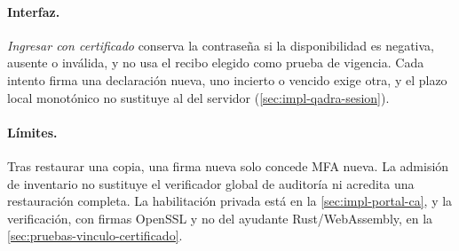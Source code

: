 \paragraph{Interfaz.} \emph{Ingresar con certificado} conserva la contraseña si la disponibilidad es negativa, ausente o inválida, y no usa el recibo elegido como prueba de vigencia. Cada intento firma una declaración nueva, uno incierto o vencido exige otra, y el plazo local monotónico no sustituye al del servidor (\cref{sec:impl-qadra-sesion}).

\paragraph{Límites.} Tras restaurar una copia, una firma nueva solo concede MFA nueva. La admisión de inventario no sustituye el verificador global de auditoría ni acredita una restauración completa. La habilitación privada está en la \cref{sec:impl-portal-ca}, y la verificación, con firmas OpenSSL y no del ayudante Rust/WebAssembly, en la \cref{sec:pruebas-vinculo-certificado}.

